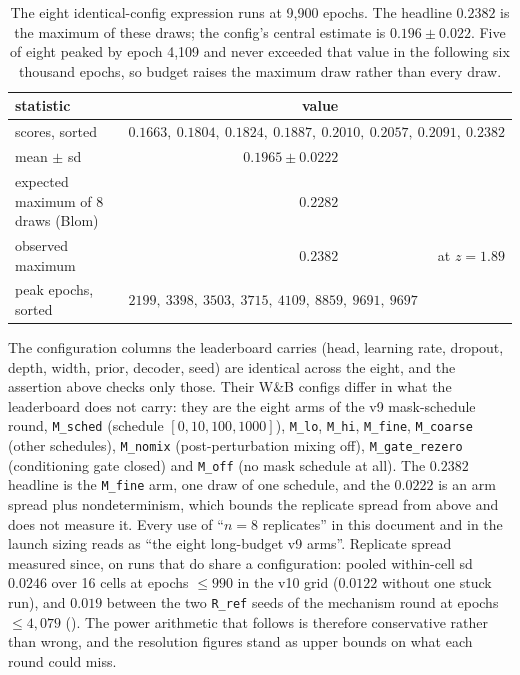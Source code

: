 \begin{table}[htbp]
\centering\small
\begin{tabular}{lrr}
\toprule
statistic & value & \\
\midrule
scores, sorted & \multicolumn{2}{l}{$0.1663,\ 0.1804,\ 0.1824,\ 0.1887,\ 0.2010,\ 0.2057,\ 0.2091,\ 0.2382$} \\
mean $\pm$ sd & $0.1965 \pm 0.0222$ & \\
expected maximum of 8 draws (Blom) & $0.2282$ & \\
observed maximum & $0.2382$ & at $z = 1.89$ \\
peak epochs, sorted & \multicolumn{2}{l}{$2199,\ 3398,\ 3503,\ 3715,\ 4109,\ 8859,\ 9691,\ 9697$} \\
\bottomrule
\end{tabular}
\caption[]{The eight identical-config expression runs at 9,900 epochs. The headline
$0.2382$ is the maximum of these draws; the config's central estimate is
$0.196 \pm 0.022$. Five of eight peaked by epoch 4,109 and never exceeded that value in the
following six thousand epochs, so budget raises the maximum draw rather than every draw.}
\label{tab:launch-replicates}
\end{table}

 The configuration columns the leaderboard carries (head, learning rate,
dropout, depth, width, prior, decoder, seed) are identical across the eight, and the
assertion above checks only those. Their W\&B configs differ in what the leaderboard does
not carry: they are the eight arms of the v9 mask-schedule round, \texttt{M\_sched}
(schedule $[0, 10, 100, 1000]$), \texttt{M\_lo}, \texttt{M\_hi}, \texttt{M\_fine},
\texttt{M\_coarse} (other schedules), \texttt{M\_nomix} (post-perturbation mixing off),
\texttt{M\_gate\_rezero} (conditioning gate closed) and \texttt{M\_off} (no mask schedule
at all). The $0.2382$ headline is the \texttt{M\_fine} arm, one draw of one schedule, and
the $0.0222$ is an arm spread plus nondeterminism, which bounds the replicate spread from
above and does not measure it. Every use of ``$n = 8$ replicates'' in this document and
in the launch sizing reads as ``the eight long-budget v9 arms''. Replicate spread measured
since, on runs that do share a configuration: pooled within-cell sd $0.0246$ over 16 cells
at epochs $\le 990$ in the v10 grid ($0.0122$ without one stuck run), and $0.019$ between
the two \texttt{R\_ref} seeds of the mechanism round at epochs $\le 4{,}079$
(). The power arithmetic that follows is
therefore conservative rather than wrong, and the resolution figures stand as upper
bounds on what each round could miss.

